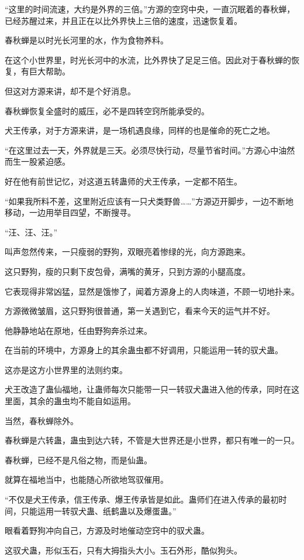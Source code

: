 \begin{this_body}
“这里的时间流速，大约是外界的三倍。”方源的空窍中央，一直沉眠着的春秋蝉，已经苏醒过来，并且正在以比外界快上三倍的速度，迅速恢复着。

春秋蝉是以时光长河里的水，作为食物养料。

在这个小世界里，时光长河中的水流，比外界快了足足三倍。因此对于春秋蝉的恢复，有巨大帮助。

但这对方源来讲，却不是个好消息。

春秋蝉恢复全盛时的威压，必不是四转空窍所能承受的。

犬王传承，对于方源来讲，是一场机遇良缘，同样的也是催命的死亡之地。

“在这里过去一天，外界就是三天。必须尽快行动，尽量节省时间。”方源心中油然而生一股紧迫感。

好在他有前世记忆，对这道五转蛊师的犬王传承，一定都不陌生。

“如果我所料不差，这里附近应该有一只犬类野兽……”方源迈开脚步，一边不断地移动，一边用举目四望，不断搜寻。

“汪、汪、汪。”

叫声忽然传来，一只瘦弱的野狗，双眼亮着惨绿的光，向方源跑来。

这只野狗，瘦的只剩下皮包骨，满嘴的黄牙，只到方源的小腿高度。

它表现得非常凶猛，显然是饿惨了，闻着方源身上的人肉味道，不顾一切地扑来。

方源微微皱眉，这只野狗很普通，第一关遇到它，看来今天的运气并不好。

他静静地站在原地，任由野狗奔杀过来。

在当前的环境中，方源身上的其余蛊虫都不好调用，只能运用一转的驭犬蛊。

这亦是这方小世界里的法则约束。

犬王改造了蛊仙福地，让蛊师每次只能带一只一转驭犬蛊进入他的传承，同时在这里面，其余的蛊虫均不能自如运用。

当然，春秋蝉除外。

春秋蝉是六转蛊，蛊虫到达六转，不管是大世界还是小世界，都只有唯一的一只。

春秋蝉，已经不是凡俗之物，而是仙蛊。

就算在福地当中，也能随心所欲地驾驭催用。

“不仅是犬王传承，信王传承、爆王传承皆是如此。蛊师们在进入传承的最初时间，只能运用一转驭犬蛊、纸鹤蛊以及爆蛋蛊。”

眼看着野狗冲向自己，方源及时地催动空窍中的驭犬蛊。

这驭犬蛊，形似玉石，只有大拇指头大小。玉石外形，酷似狗头。


\end{this_body}
